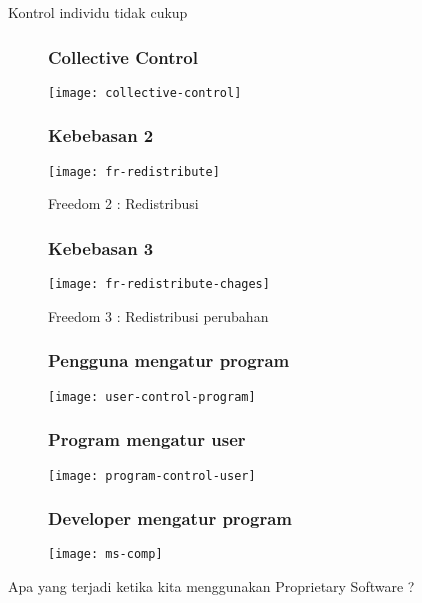 \documentclass[notes]{beamer}       %
\begin{document}
\begin{frame}
  \begin{center}
    \Huge Kontrol individu tidak cukup
  \end{center}
\end{frame}

\begin{frame}
  \begin{figure}
    \frametitle{Collective Control}
    \centering
    \texttt{[image: collective-control]}
  \end{figure}
\end{frame}

\begin{frame}
  \begin{figure}
    \frametitle{Kebebasan 2}
    \centering
    \texttt{[image: fr-redistribute]}
    \caption{Freedom 2 : Redistribusi}
  \end{figure}
\end{frame}

\begin{frame}
  \begin{figure}
    \frametitle{Kebebasan 3}
    \centering
    \texttt{[image: fr-redistribute-chages]}
    \caption{Freedom 3 : Redistribusi perubahan}    
  \end{figure}
\end{frame}


\begin{frame}
  \begin{figure}
    \frametitle{Pengguna mengatur program}
    \centering
    \texttt{[image: user-control-program]}
  \end{figure}
\end{frame}

\begin{frame}
  \begin{figure}
    \frametitle{Program mengatur user}
    \centering
    \texttt{[image: program-control-user]}
  \end{figure}
\end{frame}

\begin{frame}
  \begin{figure}
    \frametitle{Developer mengatur program}
    \centering
    \texttt{[image: ms-comp]}
  \end{figure}
\end{frame}

\begin{frame}
  \begin{center}
    \Large Apa yang terjadi ketika kita menggunakan Proprietary Software ? \\
  \end{center}
\end{frame}
\end{document}
